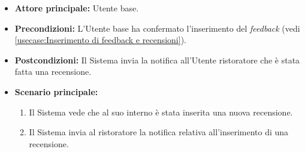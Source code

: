 \label{usecase:Notifica di inserimento feedback}
\begin{itemize}
	\item \textbf{Attore principale:} Utente base.
	
	\item \textbf{Precondizioni:} L'Utente base ha confermato l'inserimento del \textit{feedback} (vedi \autoref{usecase:Inserimento di feedback e recensioni}).

	\item \textbf{Postcondizioni:} Il Sistema invia la notifica all'Utente ristoratore che è stata fatta una recensione.
     
	\item \textbf{Scenario principale:}
	      \begin{enumerate}
                \item Il Sistema vede che al suo interno è stata inserita una nuova recensione.
                \item Il Sistema invia al ristoratore la notifica relativa all'inserimento di una recensione.
	      \end{enumerate}
\end{itemize}